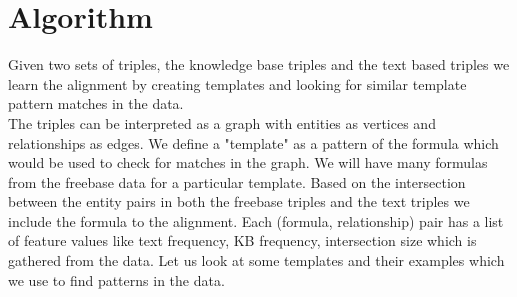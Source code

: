 \documentclass[12pt, a4paper]{article}
\begin{document}
\section{Algorithm}
Given two sets of triples, the knowledge base triples and the text based triples we learn the alignment by creating templates and looking for similar template pattern matches in the data.\\

The triples can be interpreted as a graph with entities as vertices and relationships as edges. We define a "template" as a pattern of the formula which would be used to check for matches in the graph. We will have many formulas from the freebase data for a particular template. Based on the intersection between the entity pairs in both the freebase triples and the text triples we include the formula to the alignment. Each (formula, relationship) pair has a list of feature values like text frequency, KB frequency, intersection size which is gathered from the data. Let us look at some templates and their examples which we use to find patterns in the data.\\
\end{document}
